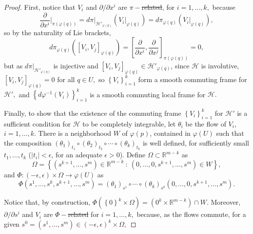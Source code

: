 \documentclass[12pt, letterpaper, reqno]{amsart}
\theoremstyle{definition}
\theoremstyle{plain}
\theoremstyle{remark}
\providecommand{\DIFadd}[1]{{\protect\color{blue}\uwave{#1}}} %
\providecommand{\DIFdel}[1]{{\protect\color{red}\sout{#1}}}                      %
\providecommand{\DIFaddbegin}{} %
\providecommand{\DIFaddend}{} %
\providecommand{\DIFdelbegin}{} %
\providecommand{\DIFdelend}{} %
\newcommand{\DIFscaledelfig}{0.5}
\newlength{\DIFdelgraphicswidth} %
\newlength{\DIFdelgraphicsheight} %
\newcommand{\DIFaddincludegraphics}[2][]{{\color{blue}\fbox{\DIFOincludegraphics[#1]{#2}}}} %
\newcommand{\DIFdelincludegraphics}[2][]{%
\sbox{\DIFdelgraphicsbox}{\DIFOincludegraphics[#1]{#2}}%
\settoboxwidth{\DIFdelgraphicswidth}{\DIFdelgraphicsbox} %
\settoboxtotalheight{\DIFdelgraphicsheight}{\DIFdelgraphicsbox} %
\scalebox{\DIFscaledelfig}{%
\parbox[b]{\DIFdelgraphicswidth}{\usebox{\DIFdelgraphicsbox}\\[-\baselineskip] \rule{\DIFdelgraphicswidth}{0em}}\llap{\resizebox{\DIFdelgraphicswidth}{\DIFdelgraphicsheight}{%
\setlength{\unitlength}{\DIFdelgraphicswidth}%
\begin{picture}(1,1)%
\thicklines\linethickness{2pt} %
{\color[rgb]{1,0,0}\put(0,0){\framebox(1,1){}}}%
{\color[rgb]{1,0,0}\put(0,0){\line( 1,1){1}}}%
{\color[rgb]{1,0,0}\put(0,1){\line(1,-1){1}}}%
\end{picture}%
}\hspace*{3pt}}} %
} %
\DeclareRobustCommand{\DIFaddbegin}{\DIFOaddbegin \let\includegraphics\DIFaddincludegraphics} %
\DeclareRobustCommand{\DIFaddend}{\DIFOaddend \let\includegraphics\DIFOincludegraphics} %
\DeclareRobustCommand{\DIFdelbegin}{\DIFOdelbegin \let\includegraphics\DIFdelincludegraphics} %
\DeclareRobustCommand{\DIFdelend}{\DIFOaddend \let\includegraphics\DIFOincludegraphics} %
\begin{document}
\begin{proof}
	First, notice that $ V_i $ and $ \partial/\partial x^i $ are \DIFdelbegin \DIFdel{$ \pi- $related}\DIFdelend \DIFaddbegin \DIFadd{$ \pi $-related}\DIFaddend , for $ i=1,\dots,k, $ because
	$$ \frac{\partial}{\partial x^i} \Big|_{\pi(\varphi(q))} = d\pi |_{\mathcal{H}'_{\varphi(q)}} \left( V_i |_{\varphi(q)} \right) = d\pi_{\varphi(q)}(V_i|_{\varphi(q)}), $$ 
	so by the naturality of Lie brackets,
	$$ d\pi_{\varphi(q)} \left( \left[ V_i,V_j \right]_{\varphi(q)} \right)= \left[ \frac{\partial}{\partial x^i}, \frac{\partial}{\partial x^j}   \right]_{\pi(\varphi(q))}=0, $$ 
	but as $ d\pi|_{\mathcal{H}'_{\varphi(q)}} $ is injective and $ [V_i,V_j]_{\varphi(q)}\in \mathcal{H}'_{\varphi(q)} $, since $ \mathcal{H} $ is involutive, $ [V_i,V_j]_{\varphi(q)}=0 $ for all $ q\in U, $ so $ \left\{ V_i \right\}_{i=1}^k $ form a smooth commuting frame for $ \mathcal{H}', $ and $ \left\{ d\varphi^{-1}(V_i) \right\}_{i=1}^k $ is a smooth commuting local frame for $ \mathcal{H}. $   

	Finally, to show that the existence of the commuting frame $ \left\{V_i \right\}_{i=1}^k $ for $ \mathcal{H}' $ is a sufficient condition for $ \mathcal{H} $ to be completely integrable, let $ \theta_i $ be the flow of $ V_i, $ $i=1,\dots,k.$ There is a neighborhood $ W $ of $ \varphi(p)  $, contained in $ \varphi(U) $ such that the composition  
	$ (\theta_1)_{t_1}\circ(\theta_2)_{t_2}\circ\cdots\circ(\theta_k)_{t_k} $
	is well defined, for sufficiently small $ t_1,\dots,t_k $ ($|t_i|<\epsilon  $, for an adequate $ \epsilon>0$). Define $ \Omega \subset \mathbb{R}^{m-k} $ as    
	$$ \Omega = \left\{ (s^{k+1},\dots,s^m)\in \mathbb{R}^{m-k}\ : \ (0,\dots,0,s^{k+1},\dots,s^m)\in W \right\}, $$ 
	and $\Phi:(-\epsilon,\epsilon)\times \Omega \rightarrow \varphi(U)$ as
	$$ \Phi(s^1,\dots,s^k,s^{k+1},\dots,s^m)=(\theta_1)_{s^1}\circ\cdots\circ(\theta_k)_{s^k}(0,\dots,0,s^{k+1},\dots,s^m). $$ 

	Notice that, by construction, $ \Phi( \left\{ 0 \right\}^k\times\Omega) = ({0}^k\times \mathbb{R}^{m-k})\cap W. $ Moreover, $ \partial/\partial s^i $ and $ V_i $ are \DIFdelbegin \DIFdel{$ \Phi- $related }\DIFdelend \DIFaddbegin \DIFadd{$ \Phi $-related }\DIFaddend for $ i=1,\dots,k, $ because, as the flows commute, for a given $ s^0=(s^1,\dots,s^m)\in (-\epsilon,\epsilon)^k\times \Omega, $ 


\end{proof}
\end{document}
